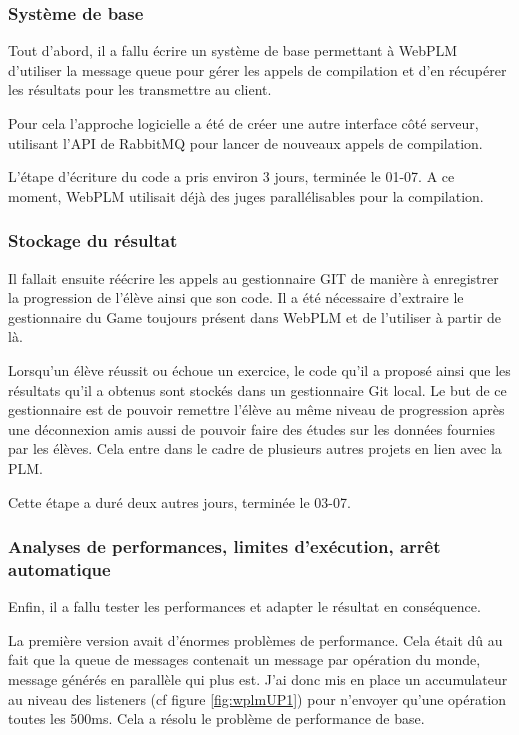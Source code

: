 \documentclass[stage]{tnreport}
\begin{document}
\subsubsection{Système de base}
Tout d'abord, il a fallu écrire un système de base permettant à WebPLM d'utiliser la message queue pour gérer les appels de compilation et d'en récupérer les résultats pour les transmettre au client.

Pour cela l'approche logicielle a été de créer une autre interface côté serveur, utilisant l'API de RabbitMQ pour lancer de nouveaux appels de compilation.

L'étape d'écriture du code a pris environ 3 jours, terminée le 01-07. A ce moment, WebPLM utilisait déjà des juges parallélisables pour la compilation.

\subsubsection{Stockage du résultat}
Il fallait ensuite réécrire les appels au gestionnaire GIT de manière à enregistrer la progression de l'élève ainsi que son code. Il a été nécessaire d'extraire le gestionnaire du Game toujours présent dans WebPLM et de l'utiliser à partir de là.

Lorsqu'un élève réussit ou échoue un exercice, le code qu'il a proposé ainsi que les résultats qu'il a obtenus sont stockés dans un gestionnaire Git local. Le but de ce gestionnaire est de pouvoir remettre l'élève au même niveau de progression après une déconnexion amis aussi de pouvoir faire des études sur les données fournies par les élèves. Cela entre dans le cadre de plusieurs autres projets en lien avec la PLM.

Cette étape a duré deux autres jours, terminée le 03-07.

\subsubsection{Analyses de performances, limites d'exécution, arrêt automatique}
Enfin, il a fallu tester les performances et adapter le résultat en conséquence.

La première version avait d'énormes problèmes de performance. Cela était dû au fait que la queue de messages contenait un message par opération du monde, message générés en parallèle qui plus est.
J'ai donc mis en place un accumulateur au niveau des listeners (cf figure \ref{fig:wplmUP1}) pour n'envoyer qu'une opération toutes les 500ms. Cela a résolu le problème de performance de base.
\end{document}
